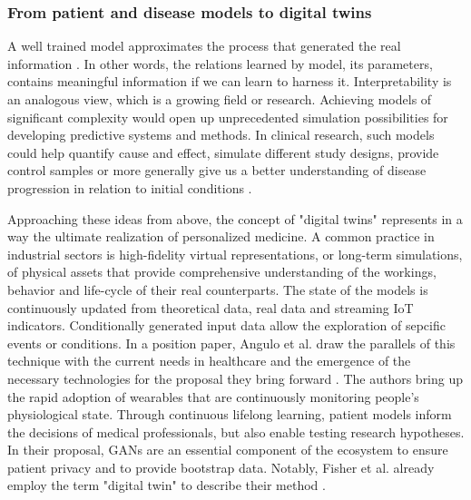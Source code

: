     \subsubsection{From patient and disease models to digital twins}\label{sec:models_twins}
    A well trained model approximates the process that generated the real information \cite{esteban2017real}. In other words, the relations learned by model, its parameters, contains meaningful information if we can learn to harness it. Interpretability is an analogous view, which is a growing field or research. Achieving models of significant complexity would open up unprecedented simulation possibilities for developing predictive systems and methods. In clinical research, such models could help quantify cause and effect, simulate different study designs, provide control samples or more generally give us a better understanding of disease progression in relation to initial conditions \cite{Fisher2019, yahi2017generative, walsh2020generating}.\par
    Approaching these ideas from above, the concept of "digital twins" represents in a way the ultimate realization of personalized medicine. A common practice in industrial sectors is high-fidelity virtual representations, or long-term simulations, of physical assets that provide comprehensive understanding of the workings, behavior and life-cycle of their real counterparts. The state of the models is continuously updated from theoretical data, real data and streaming IoT indicators. Conditionally generated input data allow the exploration of sepcific events or conditions. In a position paper, Angulo et al. draw the parallels of this technique with the current needs in healthcare and the emergence of the necessary technologies for the proposal they bring forward \cite{angulo2019towards,Angulo_2020}. The authors bring up the rapid adoption of wearables that are continuously monitoring people's physiological state. Through continuous lifelong learning, patient models inform the decisions of medical professionals, but also enable testing research hypotheses. In their proposal, GANs are an essential component of the ecosystem to ensure patient privacy and to provide bootstrap data. Notably, Fisher et al. already employ the term "digital twin" to describe their method \cite{walsh2020generating}.